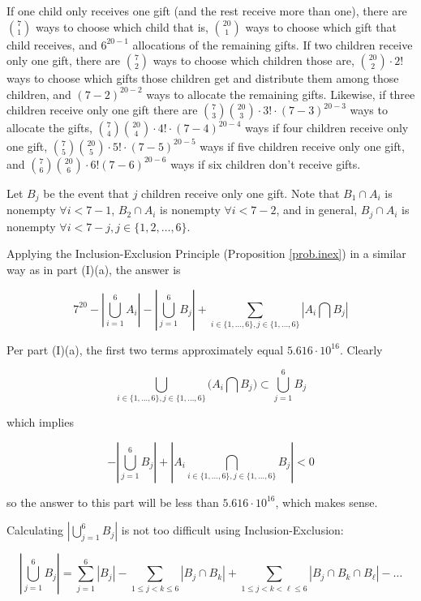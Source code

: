 \begin{enumerate}[(I)]
\begin{enumerate}[(a)]
If one child only receives one gift (and the rest receive more than one), there are \(\binom{7}{1}\) ways to choose which child that is, \(\binom{20}{1}\) ways to choose which gift that child receives, and \(6^{20 - 1}\) allocations of the remaining gifts. If two children receive only one gift, there are \(\binom{7}{2}\) ways to choose which children those are, \(\binom{20}{2} \cdot 2!\) ways to choose which gifts those children get and distribute them among those children, and \( (7-2)^{20 - 2}\) ways to allocate the remaining gifts. Likewise, if three children receive only one gift there are \(\binom{7}{3} \binom{20}{3} \cdot 3!  \cdot (7-3)^{20-3}\) ways to allocate the gifts, \(\binom{7}{4} \binom{20}{4}  \cdot 4!\cdot (7-4)^{20 - 4}\) ways if four children receive only one gift, \(\binom{7}{5} \binom{20}{5} \cdot 5! \cdot (7-5)^{20 - 5}\) ways if five children receive only one gift, and \(\binom{7}{6} \binom{20}{6} \cdot 6!  (7-6)^{20-6}\) ways if six children don't receive gifts.

Let \(B_j\) be the event that \(j\) children receive only one gift. Note that \(B_1 \cap A_i \) is nonempty \( \forall i < 7 - 1 \),  \(B_2 \cap A_i \) is nonempty \( \forall i < 7 - 2 \), and in general, \(B_j \cap A_i \) is nonempty \( \forall i < 7 - j, j \in \{1, 2, \ldots, 6\} \).



Applying the Inclusion-Exclusion Principle (Proposition \ref{prob.inex}) in a similar way as in part (I)(a), the answer is

\[\boxed{
7^{20} - \left| \bigcup_{i=1}^6 A_i \right| - \left| \bigcup_{j=1}^6 B_j \right| + \sum_{i \in \{1, \ldots, 6\}, j \in \{1, \ldots, 6\}} \left| A_i \bigcap B_j \right| }
\]

Per part (I)(a), the first two terms approximately equal \(5.616 \cdot 10^ 16\). Clearly

\[
\bigcup_{i \in \{1, \ldots, 6\}, j \in \{1, \ldots, 6\}}  \bigg( A_i \bigcap B_j \bigg) \subset  \bigcup_{j=1}^6 B_j 
\]

which implies

\[
 - \left| \bigcup_{j=1}^6 B_j \right| + \left| A_i \bigcap_{i \in \{1, \ldots, 6\}, j \in \{1, \ldots, 6\}} B_j \right|  < 0
\]

so the answer to this part will be less than \(5.616 \cdot 10^ 16\), which makes sense. 

Calculating  \( \left| \bigcup_{j=1}^6 B_j \right|  \) is not too difficult using Inclusion-Exclusion:

\[
 \left| \bigcup_{j=1}^6 B_j \right| =\sum_{j=1}^6  \left| B_j \right|  -  \sum_{1 \leq j < k \leq 6} \left|B_j \cap B_k \right| +  \sum_{1 \leq j < k < \ell \leq 6} \left|B_j \cap B_k \cap B_{\ell} \right|  -  \ldots 
\]


\end{enumerate}
\end{enumerate}
